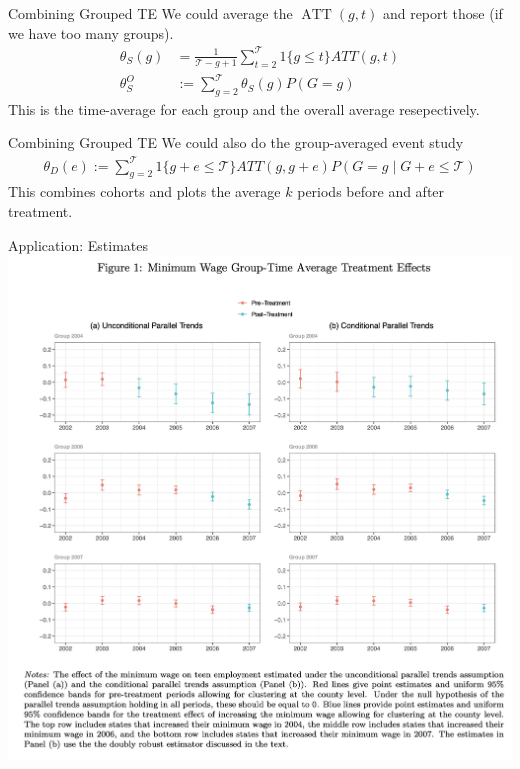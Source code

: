 \documentclass[xcolor=pdftex,dvipsnames,table,mathserif,aspectratio=169]{beamer}
\begin{document}
\begin{frame}{Combining Grouped TE}
We could average the $\operatorname{ATT}(g, t)$ and report those (if we have too many groups).
\begin{align*}
\theta_{S}(g)&=\frac{1}{\mathcal{T}-g+1} \sum_{t=2}^{\mathcal{T}} 1\{g \leq t\} A T T(g, t)\\
\theta_{S}^{O}&:=\sum_{g=2}^{\mathcal{T}} \theta_{S}(g) P(G=g)
\end{align*}
This is the \alert{time-average} for each group and the overall average resepectively.
\end{frame}

\begin{frame}{Combining Grouped TE}
We could also do the group-averaged \alert{event study}
\begin{align*}
\theta_{D}(e):=\sum_{g=2}^{\mathcal{T}} 1\{g+e \leq \mathcal{T}\} A T T(g, g+e) P(G=g \mid G+e \leq \mathcal{T})
\end{align*}
This combines cohorts and plots the average $k$ periods before and after treatment.
\end{frame}

\begin{frame}{Application: Estimates}
\centering
\includegraphics[height=0.9\textheight]{resources/csa_fig1.png}
\end{frame}
\end{document}
